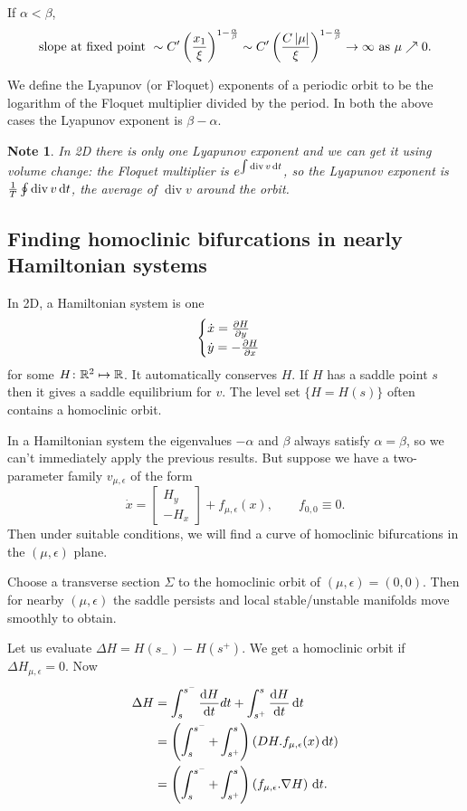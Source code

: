 \documentclass{notes}
\theoremstyle{plain}
\newtheorem*{note}{Note}
\DeclareMathOperator{\dive}{div}
\begin{document}
If $\alpha < \beta$,
\[
\text{slope at fixed point }
\sim C' \left(\frac{x_1}{\xi}
\right)^{1 - \frac{\alpha}{\beta}} \sim C' 
\left( \frac{C \left|\mu\right|}{\xi}
\right)^{1 - \frac{\alpha}{\beta}} \to \infty \text{ as } \mu \nearrow 0.
\]

We define the Lyapunov (or Floquet) exponents of a periodic orbit to be
the logarithm of the Floquet multiplier divided by the period.  In both
the above cases the Lyapunov exponent is $\beta - \alpha$.

\begin{note}
In 2D there is only one Lyapunov exponent and we can get it using volume
change: the Floquet multiplier is $e^{\int \dive v\,\ud t}$, so the
Lyapunov exponent is $\frac{1}{T} \oint \dive v\,\ud t$, the average of
$\dive v$ around the orbit.
\end{note}

\subsection{Finding homoclinic bifurcations in nearly Hamiltonian systems}

In 2D, a Hamiltonian system is one
\[
\begin{cases}
\dot{x} = \frac{\partial H}{\partial y} \\
\dot{y} = - \frac{\partial H}{\partial x}
\end{cases}
\]
for some $H \colon \mathbb{R}^2 \mapsto \mathbb{R}$.  It automatically conserves $H$.
If $H$ has a saddle point $s$ then it gives a saddle equilibrium for $v$.
The level set $\{ H = H(s) \}$ often contains a homoclinic orbit.

In a Hamiltonian system the eigenvalues $-\alpha$ and $\beta$ always
satisfy $\alpha = \beta$, so we can't immediately apply the previous
results. But suppose we have a two-parameter family $v_{\mu,\epsilon}$
of the form
\[
\dot{x} = \begin{bmatrix} H_y \\ - H_x \end{bmatrix} + f_{\mu,\epsilon}(x),
\qquad f_{0,0} \equiv 0.
\]
Then under suitable conditions, we will find a curve of homoclinic bifurcations
in the $(\mu, \epsilon)$ plane.

Choose a transverse section $\Sigma$ to the homoclinic orbit of
$(\mu,\epsilon) = (0,0)$.  Then for nearby $(\mu,\epsilon)$ the saddle
persists and local stable/unstable manifolds move smoothly to obtain.
\vspace{1in}

Let us evaluate $\Delta H = H(s_-) - H(s^+)$.  We get a homoclinic orbit
if $\Delta H_{\mu,\epsilon} = 0$.  Now
\begin{align*}
\Delta H &= \int_s^{s^-} \frac{\mathrm{d} H}{\mathrm{d} t} dt + \int_{s^+}^s \frac{\mathrm{d} H}{\mathrm{d} t}\,\mathrm{d} t \\
&= \left(\int_s^{s^-} + \int_{s^+}^s \right) \left(
DH.f_{\mu,\epsilon}(x)\,\mathrm{d} t\right) \\
&= \left(\int_s^{s^-} + \int_{s^+}^s \right) \left( f_{\mu,\epsilon}.
\nabla H\right)\,\mathrm{d} t.
\end{align*}
\end{document}
